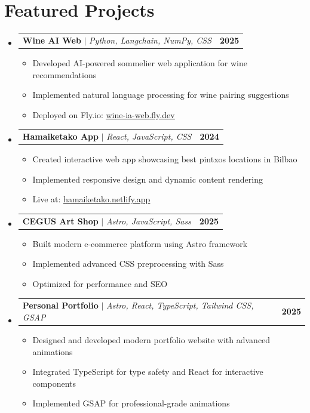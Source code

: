 \documentclass[letterpaper,11pt]{article}
\makeatletter
\newcommand{\resumeItem}[1]{
  \item\small{
    {#1 \vspace{-2pt}}
  }
}
\newcommand{\resumeProjectHeading}[2]{
    \item
    \begin{tabular*}{1.001\textwidth}{l@{\extracolsep{\fill}}r}
      \small#1 & \textbf{\small #2}\\
    \end{tabular*}\vspace{-7pt}
}
\newcommand{\resumeSubHeadingListStart}{\begin{itemize}[leftmargin=0.0in, label={}]}
\newcommand{\resumeSubHeadingListEnd}{\end{itemize}}
\newcommand{\resumeItemListStart}{\begin{itemize}}
\newcommand{\resumeItemListEnd}{\end{itemize}\vspace{-5pt}}
\makeatother
\begin{document}
\section{Featured Projects}
    \vspace{-5pt}
    \resumeSubHeadingListStart
      \resumeProjectHeading
          {\textbf{Wine AI Web} $|$ \emph{Python, Langchain, NumPy, CSS}}{2025}
          \resumeItemListStart
            \resumeItem{Developed AI-powered sommelier web application for wine recommendations}
            \resumeItem{Implemented natural language processing for wine pairing suggestions}
            \resumeItem{Deployed on Fly.io: \href{https://wine-ia-web.fly.dev/home}{\underline{wine-ia-web.fly.dev}}}
          \resumeItemListEnd
          \vspace{-13pt}
      \resumeProjectHeading
          {\textbf{Hamaiketako App} $|$ \emph{React, JavaScript, CSS}}{2024}
          \resumeItemListStart
            \resumeItem{Created interactive web app showcasing best pintxos locations in Bilbao}
            \resumeItem{Implemented responsive design and dynamic content rendering}
            \resumeItem{Live at: \href{https://hamaiketako.netlify.app/}{\underline{hamaiketako.netlify.app}}}
          \resumeItemListEnd 
          \vspace{-13pt}
      \resumeProjectHeading
          {\textbf{CEGUS Art Shop} $|$ \emph{Astro, JavaScript, Sass}}{2025}
          \resumeItemListStart
            \resumeItem{Built modern e-commerce platform using Astro framework}
            \resumeItem{Implemented advanced CSS preprocessing with Sass}
            \resumeItem{Optimized for performance and SEO}
          \resumeItemListEnd 
          \vspace{-13pt}
      \resumeProjectHeading
          {\textbf{Personal Portfolio} $|$ \emph{Astro, React, TypeScript, Tailwind CSS, GSAP}}{2025}
          \resumeItemListStart
            \resumeItem{Designed and developed modern portfolio website with advanced animations}
            \resumeItem{Integrated TypeScript for type safety and React for interactive components}
            \resumeItem{Implemented GSAP for professional-grade animations}
          \resumeItemListEnd 
    \resumeSubHeadingListEnd
\vspace{-15pt}

\end{document}
